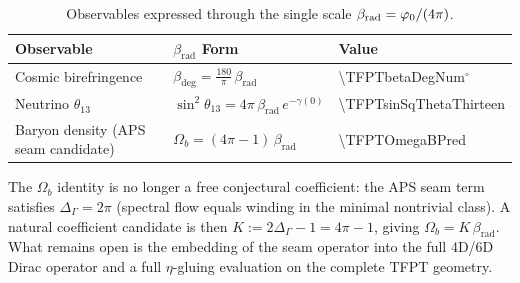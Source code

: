 \begin{table}[H]
\centering
\begin{tabular}{@{}lll@{}}
\toprule
\textbf{Observable} & \textbf{$\beta_{\text{rad}}$ Form} & \textbf{Value}\\
\midrule
Cosmic birefringence & $\beta_{\text{deg}} = \frac{180}{\pi}\,\beta_{\text{rad}}$ & \num[round-mode=places,round-precision=4]{\TFPTbetaDegNum}$^\circ$\\
Neutrino $\theta_{13}$ & $\sin^2\theta_{13} = 4\pi\,\beta_{\text{rad}}\,e^{-\gamma(0)}$ & \num[round-mode=places,round-precision=6]{\TFPTsinSqThetaThirteen}\\
Baryon density (APS seam candidate) & $\Omega_b = (4\pi - 1)\,\beta_{\text{rad}}$ & \num[round-mode=places,round-precision=6]{\TFPTOmegaBPred}\\
\bottomrule
\end{tabular}
\caption{Observables expressed through the single scale $\beta_{\text{rad}} = \varphi_0/(4\pi)$.}
\label{tab:beta}
\end{table}

\begin{remark}
The $\Omega_b$ identity is no longer a free conjectural coefficient: the APS seam term satisfies $\Delta_\Gamma=2\pi$ (spectral flow equals winding in the minimal nontrivial class).
A natural coefficient candidate is then $K:=2\Delta_\Gamma-1=4\pi-1$, giving $\Omega_b=K\,\beta_{\mathrm{rad}}$.
What remains open is the embedding of the seam operator into the full 4D/6D Dirac operator and a full $\eta$-gluing evaluation on the complete TFPT geometry.
\end{remark}

\TFPTOmegaBTable

